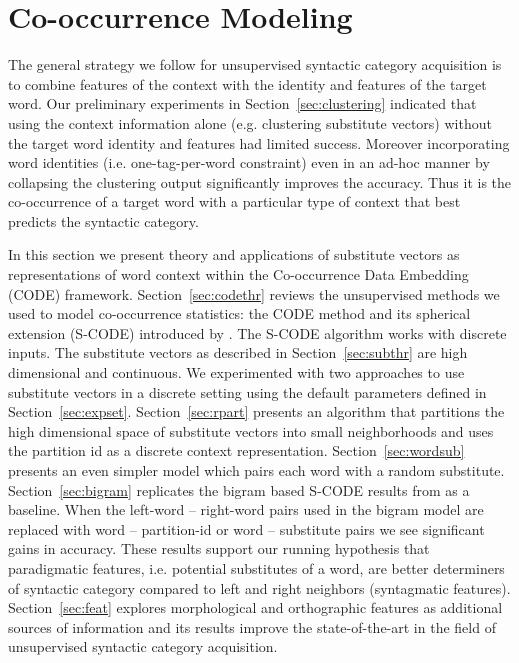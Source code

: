 \section{Co-occurrence Modeling}
\label{sec:code}

The general strategy we follow for unsupervised syntactic category
acquisition is to combine features of the context with the identity
and features of the target word.  Our preliminary experiments in
Section~\ref{sec:clustering} indicated that using the context
information alone (e.g. clustering substitute vectors) without the
target word identity and features had limited success.  Moreover
incorporating word identities (i.e. one-tag-per-word constraint) even
in an ad-hoc manner by collapsing the clustering output significantly
improves the \mto accuracy.  Thus it is the co-occurrence of a target
word with a particular type of context that best predicts the
syntactic category.  

In this section we present theory and applications of substitute
vectors as representations of word context within the Co-occurrence
Data Embedding (CODE)\cite{globerson2007euclidean} framework.
Section~\ref{sec:codethr} reviews the unsupervised methods we used to
model co-occurrence statistics: the CODE method and its spherical
extension (S-CODE) introduced by \cite{maron2010sphere}.  The S-CODE
algorithm works with discrete inputs.  The substitute vectors as
described in Section~\ref{sec:subthr} are high dimensional and
continuous.  We experimented with two approaches to use substitute
vectors in a discrete setting using the default parameters defined in
Section~\ref{sec:expset}.  Section~\ref{sec:rpart} presents an
algorithm that partitions the high dimensional space of substitute
vectors into small neighborhoods and uses the partition id as a
discrete context representation.  Section~\ref{sec:wordsub} presents
an even simpler model which pairs each word with a random substitute.
Section~\ref{sec:bigram} replicates the bigram based S-CODE results
from \cite{maron2010sphere} as a baseline.  When the left-word --
right-word pairs used in the bigram model are replaced with word --
partition-id or word -- substitute pairs we see significant gains in
accuracy.  These results support our running hypothesis that
paradigmatic features, i.e. potential substitutes of a word, are
better determiners of syntactic category compared to left and right
neighbors (syntagmatic features).  Section~\ref{sec:feat} explores
morphological and orthographic features as additional sources of
information and its results improve the state-of-the-art in the field
of unsupervised syntactic category acquisition.

